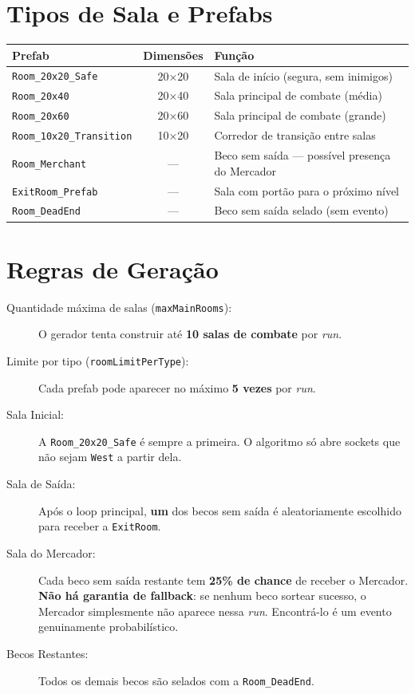 \documentclass[a4paper,12pt]{report}
\begin{document}
\section{Tipos de Sala e Prefabs}
\begin{center}
\begin{tabular}{|l|c|l|}
    \hline
    \textbf{Prefab} & \textbf{Dimensões} & \textbf{Função} \\
    \hline
    \texttt{Room\_20x20\_Safe}       & 20×20 & Sala de início (segura, sem inimigos) \\
    \texttt{Room\_20x40}             & 20×40 & Sala principal de combate (média) \\
    \texttt{Room\_20x60}             & 20×60 & Sala principal de combate (grande) \\
    \texttt{Room\_10x20\_Transition} & 10×20 & Corredor de transição entre salas \\
    \texttt{Room\_Merchant}          & —     & Beco sem saída — possível presença do Mercador \\
    \texttt{ExitRoom\_Prefab}        & —     & Sala com portão para o próximo nível \\
    \texttt{Room\_DeadEnd}           & —     & Beco sem saída selado (sem evento) \\
    \hline
\end{tabular}
\end{center}

\section{Regras de Geração}\label{sec:regras_geracao}
\begin{description}
    \item[Quantidade máxima de salas (\texttt{maxMainRooms}):] O gerador tenta construir até \textbf{10 salas de combate} por \textit{run}.
    \item[Limite por tipo (\texttt{roomLimitPerType}):] Cada prefab pode aparecer no máximo \textbf{5 vezes} por \textit{run}.
    \item[Sala Inicial:] A \texttt{Room\_20x20\_Safe} é sempre a primeira. O algoritmo só abre sockets que não sejam \texttt{West} a partir dela.
    \item[Sala de Saída:] Após o loop principal, \textbf{um} dos becos sem saída é aleatoriamente escolhido para receber a \texttt{ExitRoom}.
    \item[Sala do Mercador:] Cada beco sem saída restante tem \textbf{25\% de chance} de receber o Mercador. \textbf{Não há garantia de fallback}: se nenhum beco sortear sucesso, o Mercador simplesmente não aparece nessa \textit{run}. Encontrá-lo é um evento genuinamente probabilístico.
    \item[Becos Restantes:] Todos os demais becos são selados com a \texttt{Room\_DeadEnd}.
\end{description}
\end{document}
